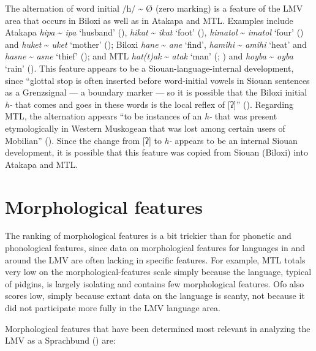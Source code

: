 \documentclass[output=paper]{LSP/langsci}
\begin{document}
The alternation of word initial /h/ \textasciitilde{} Ø (zero marking) is a feature of the LMV area that occurs in Biloxi as well as in Atakapa and MTL. Examples include Atakapa \emph{hipa} \textasciitilde{} \emph{ipa} `husband' (\citealt[42]{GatschetSwanton1932}), \emph{hikat} \textasciitilde{} \emph{ikat} `foot' (\citealt[40]{GatschetSwanton1932}), \emph{himatol} \textasciitilde{} \emph{imatol} `four' (\citealt[41]{GatschetSwanton1932}) and \emph{huket} \textasciitilde{} \emph{uket} `mother' (\citealt[46]{GatschetSwanton1932}); Biloxi \emph{hane} \textasciitilde{} \emph{ane} `find', \emph{hamihi} \textasciitilde{} \emph{amihi} `heat' and \emph{hasne} \textasciitilde{} \emph{asne} `thief' (\citealt[3]{DorseySwanton1912}); and MTL \emph{hat(t)ak} \textasciitilde{} \emph{atak} `man' (\citealt[88]{Crawford1978}; \citealt[295]{Drechsel1996}) and \emph{hoyba} \textasciitilde{} \emph{oyba} `rain' (\citealt[306]{Drechsel1996}). This feature appears to be a Siouan-language-internal development, since “glottal stop is often inserted before word-initial vowels in Siouan sentences as a Grenzsignal — a boundary marker — so it is possible that the Biloxi initial \emph{h-} that comes and goes in these words is the local reflex of [ʔ]”  (\citealt[3]{Rankin2011}). Regarding MTL, the alternation appears “to be instances of an \emph{h-} that was present etymologically in Western Muskogean that was lost among certain users of Mobilian” (\citealt[3]{Rankin2011}). Since the change from [ʔ] to \emph{h-} appears to be an internal Siouan development, it is possible that this feature was copied from Siouan (Biloxi) into Atakapa and MTL. 

\section{Morphological features}

The ranking of morphological features is a bit trickier than for phonetic and phonological features, since data on morphological features for languages in and around the LMV are often lacking in specific features. For example, MTL totals very low on the morphological-features scale simply because the language, typical of pidgins, is largely isolating and contains few morphological features. Ofo also scores low, simply because extant data on the language is scanty, not because it did not participate more fully in the LMV language area.

	Morphological features that have been determined most relevant in analyzing the LMV as a Sprachbund (\citealt[3]{Kaufman2014}) are:
\end{document}
